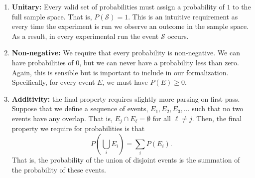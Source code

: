 \documentclass[
  letterpaper,
  DIV=11,
  numbers=noendperiod]{scrreprt}
\providecommand{\tightlist}{%
  \setlength{\itemsep}{0pt}\setlength{\parskip}{0pt}}\usepackage{longtable,booktabs,array}
\theoremstyle{definition}
\theoremstyle{definition}
\theoremstyle{definition}
\theoremstyle{remark}
\begin{document}
\begin{tcolorbox}[enhanced jigsaw, coltitle=black, colframe=quarto-callout-tip-color-frame, colbacktitle=quarto-callout-tip-color!10!white, bottomrule=.15mm, opacitybacktitle=0.6, colback=white, toptitle=1mm, arc=.35mm, leftrule=.75mm, bottomtitle=1mm, opacityback=0, breakable, rightrule=.15mm, title={The Axioms of Probability}, left=2mm, titlerule=0mm, toprule=.15mm]

\begin{enumerate}
\def\labelenumi{\arabic{enumi}.}
\tightlist
\item
  \textbf{Unitary:} Every valid set of probabilities must assign a
  probability of \(1\) to the full sample space. That is,
  \(P(\mathcal{S}) = 1\). This is an intuitive requirement as every time
  the experiment is run we observe an outcome in the sample space. As a
  result, in every experimental run the event \(\mathcal{S}\) occurs.
\item
  \textbf{Non-negative:} We require that every probability is
  non-negative. We can have probabilities of \(0\), but we can never
  have a probability less than zero. Again, this is
  sensible\footnotemark{} but is important to include in our
  formalization. Specifically, for every event \(E\), we must have
  \(P(E) \geq 0\).
\item
  \textbf{Additivity:} the final property requires slightly more parsing
  on first pass. Suppose that we define a sequence of events,
  \(E_1, E_2, E_3, \dots\) such that no two events have any overlap.
  That is, \(E_j \cap E_\ell = \emptyset\) for all \(\ell\neq j\). Then,
  the final property we require for probabilities is that
  \[P\left(\bigcup_i E_i\right) = \sum_i P(E_i).\] That is, the
  probability of the union of disjoint events is the summation of the
  probability of these events.
\end{enumerate}

\end{tcolorbox}

\end{document}
